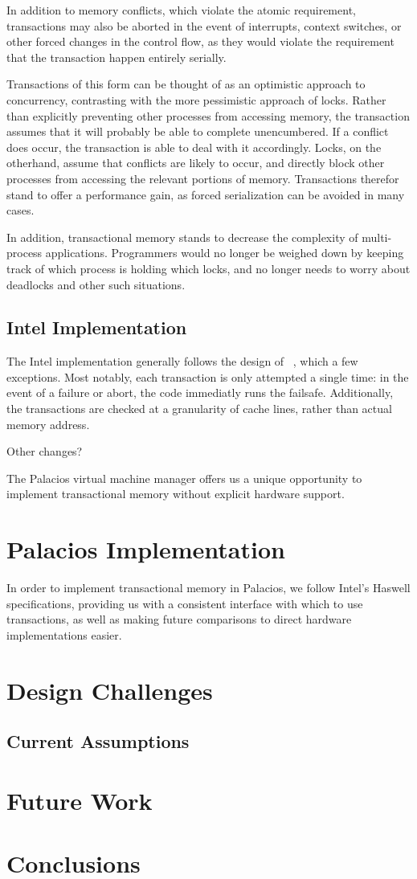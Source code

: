 \documentclass{acm_proc_article-sp}
\begin{document}
In addition to memory conflicts, which violate the atomic requirement, 
transactions may also be aborted in the event of interrupts, context switches,
or other forced changes in the control flow, as they would violate the
requirement that the transaction happen entirely serially. 

Transactions of this form can be thought of as an optimistic approach to
concurrency, contrasting with the more pessimistic approach of locks. 
Rather than explicitly preventing other processes from accessing memory, the
transaction assumes that it will probably be able to complete unencumbered. If
a conflict does occur, the transaction is able to deal with it accordingly.
Locks, on the otherhand, assume that conflicts are likely to occur, and 
directly block other processes from accessing the relevant portions of memory.
Transactions therefor stand to offer a performance gain, as forced 
serialization can be avoided in many cases.

In addition, transactional memory stands to decrease the complexity of 
multi-process applications. Programmers would no longer be weighed down by 
keeping track of which process is holding which locks, and no longer needs
to worry about deadlocks and other such situations.

\subsection{Intel Implementation}
The Intel implementation generally follows the design of 
~\cite{Herlihy:1993:TMA:173682.165164}, which a few exceptions.
Most notably, each transaction is only attempted a single time: in the event
of a failure or abort, the code immediatly runs the failsafe. Additionally, 
the transactions are checked at a granularity of cache lines, rather than
actual memory address. 

Other changes?

The Palacios virtual machine manager offers us a unique opportunity to
implement transactional memory without explicit hardware support.

\section{Palacios Implementation}
In order to implement transactional memory in Palacios, we follow Intel's
Haswell specifications, providing us with a consistent interface with which
to use transactions, as well as making future comparisons to direct hardware
implementations easier. 


\section{Design Challenges}

\subsection{Current Assumptions}

\section{Future Work}

\section{Conclusions}


\end{document}
